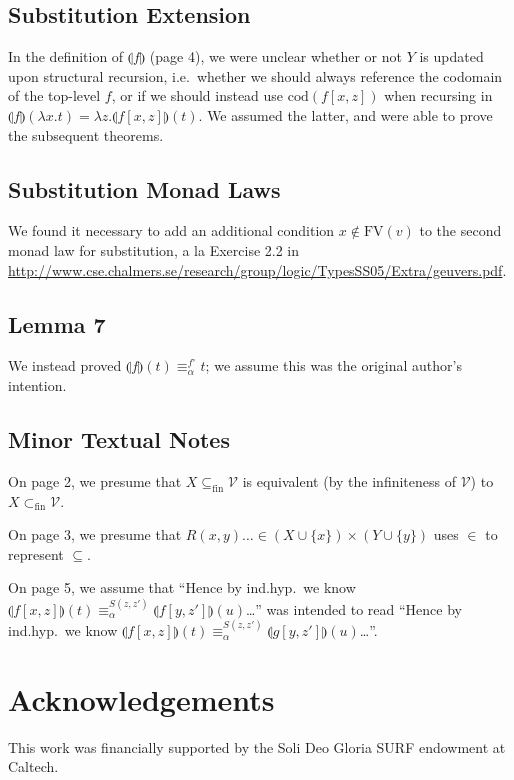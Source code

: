 \documentclass{article}
\begin{document}
\subsection{Substitution Extension}

In the definition of $\llparenthesis f \rrparenthesis$ (page 4), we were unclear whether or not $Y$
is updated upon structural recursion, i.e.\ whether we should always reference the codomain of the
top-level $f$, or if we should instead use $\textrm{cod}(f[x,z])$ when recursing in $\llparenthesis
f \rrparenthesis(\lambda x. t) = \lambda z. \llparenthesis f[x,z] \rrparenthesis (t)$. We assumed
the latter, and were able to prove the subsequent theorems.

\subsection{Substitution Monad Laws}

We found it necessary to add an additional condition $x \notin \textrm{FV}(v)$ to the second
monad law for substitution, a la Exercise 2.2 in
\url{http://www.cse.chalmers.se/research/group/logic/TypesSS05/Extra/geuvers.pdf}.

\subsection{Lemma 7}

We instead proved $\llparenthesis f \rrparenthesis (t) \equiv_\alpha^{f^\circ} t$; we assume this
was the original author's intention.

\subsection{Minor Textual Notes}

On page 2, we presume that $X \subseteq_{\textrm{fin}} \mathcal{V}$ is equivalent (by the infiniteness of
$\mathcal{V}$) to $X \subset_{\textrm{fin}} \mathcal{V}$.

On page 3, we presume that $R(x,y) \dots \in (X \cup \{ x \}) \times (Y \cup \{ y \})$ uses $\in$ to
represent $\subseteq$.

On page 5, we assume that ``Hence by ind.hyp.\ we know $\llparenthesis f[x,z] \rrparenthesis (t) \equiv_\alpha^{S(z,z')}
\llparenthesis f[y,z'] \rrparenthesis (u)$\dots'' was intended to read ``Hence by ind.hyp.\ we know $\llparenthesis f[x,z] \rrparenthesis (t) \equiv_\alpha^{S(z,z')}
\llparenthesis g[y,z'] \rrparenthesis (u)$\dots''.

\section{Acknowledgements}

This work was financially supported by the Soli Deo Gloria SURF endowment at Caltech.
\end{document}
